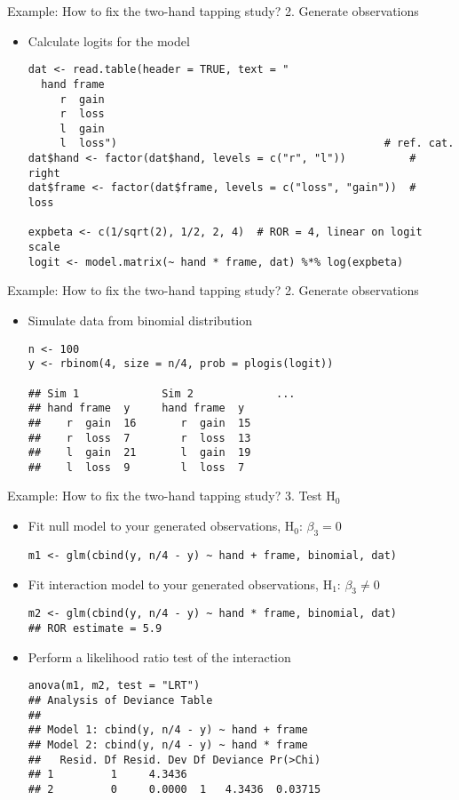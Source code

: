 \documentclass[aspectratio=169]{beamer}
\begin{document}
\begin{frame}[fragile]{Example: How to fix the two-hand tapping study?}
  {2. Generate observations}
  \begin{itemize}
    \item Calculate logits for the model
\begin{lstlisting}
dat <- read.table(header = TRUE, text = "
  hand frame
     r  gain
     r  loss
     l  gain
     l  loss")                                          # ref. cat.
dat$hand <- factor(dat$hand, levels = c("r", "l"))          #   right
dat$frame <- factor(dat$frame, levels = c("loss", "gain"))  #   loss

expbeta <- c(1/sqrt(2), 1/2, 2, 4)  # ROR = 4, linear on logit scale
logit <- model.matrix(~ hand * frame, dat) %*% log(expbeta)
\end{lstlisting}
  \end{itemize}
\end{frame}


\begin{frame}[fragile]{Example: How to fix the two-hand tapping study?}
  {2. Generate observations}
  \begin{itemize}
    \item Simulate data from binomial distribution
\begin{lstlisting}
n <- 100
y <- rbinom(4, size = n/4, prob = plogis(logit))

## Sim 1             Sim 2             ...
## hand frame  y     hand frame  y
##    r  gain  16       r  gain  15
##    r  loss  7        r  loss  13
##    l  gain  21       l  gain  19
##    l  loss  9        l  loss  7
\end{lstlisting}
  \end{itemize}
\end{frame}


\begin{frame}[fragile]{Example: How to fix the two-hand tapping study?}
  {3. Test H$_0$}
  \begin{itemize}
    \item Fit null model to your generated observations, H$_0$: $
      \beta_3 = 0$
\begin{lstlisting}
m1 <- glm(cbind(y, n/4 - y) ~ hand + frame, binomial, dat)
\end{lstlisting}
    \item Fit interaction model to your generated observations, H$_1$:
      $\beta_3 \neq 0$
\begin{lstlisting}
m2 <- glm(cbind(y, n/4 - y) ~ hand * frame, binomial, dat)
## ROR estimate = 5.9
\end{lstlisting}
    \item Perform a likelihood ratio test of the interaction
\begin{lstlisting}
anova(m1, m2, test = "LRT")
## Analysis of Deviance Table
## 
## Model 1: cbind(y, n/4 - y) ~ hand + frame
## Model 2: cbind(y, n/4 - y) ~ hand * frame
##   Resid. Df Resid. Dev Df Deviance Pr(>Chi)  
## 1         1     4.3436                       
## 2         0     0.0000  1   4.3436  0.03715
\end{lstlisting}
  \end{itemize}
\end{frame}
\end{document}
